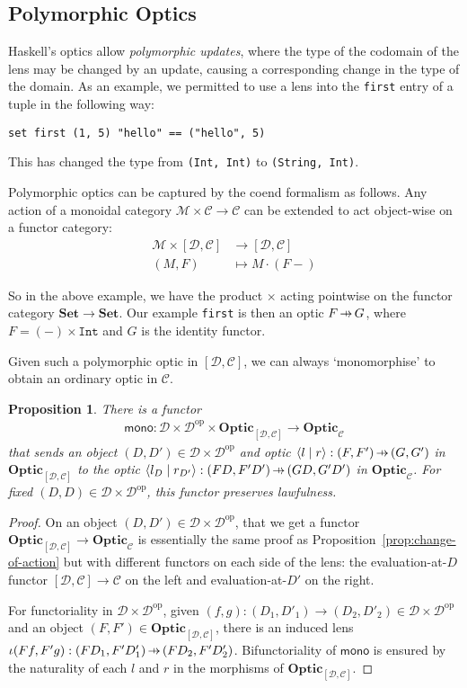 \documentclass[11pt,letterpaper]{article}
\theoremstyle{plain}
\newtheorem{proposition}[theorem]{Proposition}
\theoremstyle{definition}
\newcommand{\C}{\mathscr{C}}
\newcommand{\D}{\mathscr{D}}
\newcommand{\M}{\mathscr{M}}
\newcommand{\Set}{\mathbf{Set}}
\newcommand{\Optic}{\mathbf{Optic}}
\newcommand{\op}{\mathrm{op}}
\newcommand{\rep}[2]{{\ensuremath \left\langle #1 \mid #2 \right\rangle}}
\newcommand{\hto}{\ensuremath{\,\mathaccent\shortmid\rightarrow\,}}
\begin{document}
\subsection{Polymorphic Optics}
Haskell's optics allow \emph{polymorphic updates}, where the type of the codomain of the lens may be changed by an update, causing a corresponding change in the type of the domain. As an example, we permitted to use a lens into the \texttt{first} entry of a tuple in the following way:
\begin{verbatim}
set first (1, 5) "hello" == ("hello", 5)
\end{verbatim}
This has changed the type from \texttt{(Int, Int)} to \texttt{(String, Int)}.

Polymorphic optics can be captured by the coend formalism as follows. Any action of a monoidal category $\M \times \C \to \C$ can be extended to act object-wise on a functor category:
\begin{align*}
  \M \times [\D, \C] &\to [\D, \C] \\
  (M, F) &\mapsto  M \cdot (F-)
\end{align*}

So in the above example, we have the product $\times$ acting pointwise on the functor category $\Set \to \Set$. Our example \texttt{first} is then an optic $F \hto G$, where $F = (-) \times \texttt{Int}$ and $G$ is the identity functor.

Given such a polymorphic optic in $[\D, \C]$, we can always `monomorphise' to obtain an ordinary optic in $\C$.
\begin{proposition}
  There is a functor
  \begin{align*}
    \mathsf{mono} : \D \times \D^\op \times \Optic_{[\D, \C]} \to \Optic_\C
  \end{align*}
  that sends an object $(D, D') \in \D \times \D^\op$ and optic $\rep{l}{r} : (F, F') \hto (G, G')$ in $\Optic_{[\D, \C]}$ to the optic $\rep{l_D}{r_{D'}} : (FD, F'D') \hto (GD, G'D')$ in $\Optic_\C$. For fixed $(D, D) \in \D \times \D^\op$, this functor preserves lawfulness.
\end{proposition}
\begin{proof}
  On an object $(D, D') \in \D \times \D^\op$, that we get a functor $\Optic_{[\D, \C]} \to \Optic_\C$ is essentially the same proof as Proposition~\ref{prop:change-of-action} but with different functors on each side of the lens: the evaluation-at-$D$ functor $[\D, \C] \to \C$ on the left and evaluation-at-$D'$ on the right.

  For functoriality in $\D \times \D^\op$, given $(f, g) : (D_1, D'_1) \to (D_2, D'_2) \in \D \times \D^\op$ and an object $(F, F') \in \Optic_{[\D, \C]}$, there is an induced lens $\iota(Ff, F'g) : (FD_1, F'D'_1) \hto (FD_2, F'D'_2)$. Bifunctoriality of $\mathsf{mono}$ is ensured by the naturality of each $l$ and $r$ in the morphisms of $\Optic_{[\D, \C]}$.
\end{proof}
\end{document}
